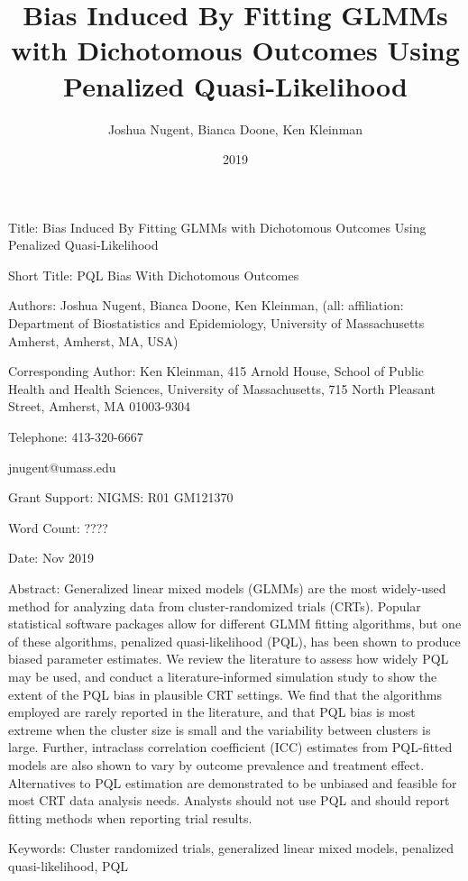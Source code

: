 \documentclass{article}
\begin{document}
\title{Bias Induced By Fitting GLMMs with Dichotomous Outcomes Using Penalized Quasi-Likelihood}
\author{Joshua Nugent, Bianca Doone, Ken Kleinman}
\date{2019}


Title: Bias Induced By Fitting GLMMs with Dichotomous Outcomes Using Penalized Quasi-Likelihood

Short Title: PQL Bias With Dichotomous Outcomes

Authors: Joshua Nugent, Bianca Doone, Ken Kleinman, (all: affiliation: Department of Biostatistics and Epidemiology, University of Massachusetts Amherst, Amherst, MA, USA)

Corresponding Author:
Ken Kleinman, 415 Arnold House, School of Public Health and Health Sciences, University of Massachusetts, 715 North Pleasant Street, Amherst, MA 01003-9304

Telephone: 413-320-6667

jnugent@umass.edu

Grant Support: NIGMS: R01 GM121370

Word Count: ????

Date: Nov 2019

\newpage

Abstract: Generalized linear mixed models (GLMMs) are the most widely-used method for analyzing data from cluster-randomized trials (CRTs). Popular statistical software packages allow for different GLMM fitting algorithms, but one of these algorithms, penalized quasi-likelihood (PQL), has been shown to produce biased parameter estimates. We review the literature to assess how widely PQL may be used, and conduct a literature-informed simulation study to show the extent of the PQL bias in plausible CRT settings. We find that the algorithms employed are rarely reported in the literature, and that PQL bias is most extreme when the cluster size is small and the variability between clusters is large. Further, intraclass correlation coefficient (ICC) estimates from PQL-fitted models are also shown to vary by outcome prevalence and treatment effect. Alternatives to PQL estimation are demonstrated to be unbiased and feasible for most CRT data analysis needs.  Analysts should not use PQL and should report fitting methods when reporting trial results.


Keywords: Cluster randomized trials, generalized linear mixed models, penalized quasi-likelihood, PQL
\end{document}
